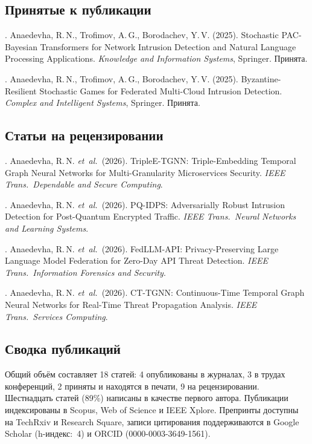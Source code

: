 \subsection*{Принятые к публикации}

. Anaedevha, R.\,N., Trofimov, A.\,G., Borodachev, Y.\,V. (2025). Stochastic PAC-Bayesian Transformers for Network Intrusion Detection and Natural Language Processing Applications. \textit{Knowledge and Information Systems}, Springer. Принята.

. Anaedevha, R.\,N., Trofimov, A.\,G., Borodachev, Y.\,V. (2025). Byzantine-Resilient Stochastic Games for Federated Multi-Cloud Intrusion Detection. \textit{Complex and Intelligent Systems}, Springer. Принята.

\subsection*{Статьи на рецензировании}

. Anaedevha, R.\,N. \textit{et~al.}\ (2026). TripleE-TGNN: Triple-Embedding Temporal Graph Neural Networks for Multi-Granularity Microservices Security. \textit{IEEE Trans.\ Dependable and Secure Computing}.

. Anaedevha, R.\,N. \textit{et~al.}\ (2026). PQ-IDPS: Adversarially Robust Intrusion Detection for Post-Quantum Encrypted Traffic. \textit{IEEE Trans.\ Neural Networks and Learning Systems}.

. Anaedevha, R.\,N. \textit{et~al.}\ (2026). FedLLM-API: Privacy-Preserving Large Language Model Federation for Zero-Day API Threat Detection. \textit{IEEE Trans.\ Information Forensics and Security}.

. Anaedevha, R.\,N. \textit{et~al.}\ (2026). CT-TGNN: Continuous-Time Temporal Graph Neural Networks for Real-Time Threat Propagation Analysis. \textit{IEEE Trans.\ Services Computing}.

\subsection*{Сводка публикаций}

Общий объём составляет 18 статей: 4 опубликованы в журналах, 3 в трудах конференций, 2 приняты и находятся в печати, 9 на рецензировании. Шестнадцать статей (89\%) написаны в качестве первого автора. Публикации индексированы в Scopus, Web of Science и IEEE Xplore. Препринты доступны на TechRxiv и Research Square, записи цитирования поддерживаются в Google Scholar (h-индекс:~4) и ORCID (0000-0003-3649-1561).

